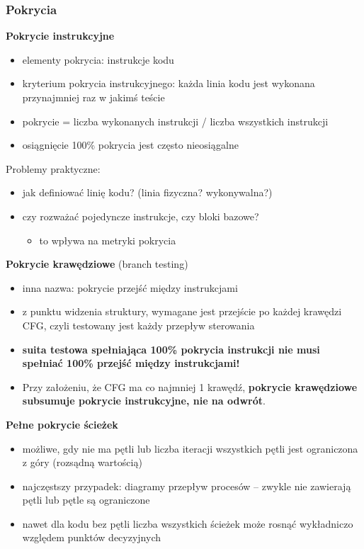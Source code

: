 \documentclass[../main.tex]{subfiles}
\begin{document}
    \subsubsection{Pokrycia}

    \textbf{Pokrycie instrukcyjne}
    \begin{itemize}
        \item elementy pokrycia: instrukcje kodu
        \item kryterium pokrycia instrukcyjnego: każda linia kodu jest wykonana
        przynajmniej raz w jakimś teście
        \item pokrycie = liczba wykonanych instrukcji / liczba wszystkich instrukcji
        \item osiągnięcie 100\% pokrycia jest często nieosiągalne
    \end{itemize}
    Problemy praktyczne:
    \begin{itemize}
        \item jak definiować linię kodu? (linia fizyczna? wykonywalna?)
        \item czy rozważać pojedyncze instrukcje, czy bloki bazowe?
        \begin{itemize}
            \item to wpływa na metryki pokrycia
        \end{itemize}
    \end{itemize}


    \textbf{Pokrycie krawędziowe} (branch testing)
    \begin{itemize}
        \item inna nazwa: pokrycie przejść między instrukcjami
        \item z punktu widzenia struktury, wymagane jest przejście po każdej
        krawędzi CFG, czyli testowany jest każdy przepływ sterowania
        \item \textbf{suita testowa spełniająca 100\% pokrycia instrukcji nie musi
        spełniać 100\% przejść między instrukcjami!}
        \item Przy założeniu, że CFG ma co najmniej 1 krawędź, \textbf{pokrycie
        krawędziowe subsumuje pokrycie instrukcyjne, nie na odwrót}.
    \end{itemize}


    \textbf{Pełne pokrycie ścieżek}
    \begin{itemize}
        \item możliwe, gdy nie ma pętli lub liczba iteracji wszystkich pętli jest ograniczona z góry (rozsądną wartością)
        \item najczęstszy przypadek: diagramy przepływ procesów – zwykle nie zawierają pętli lub pętle są ograniczone
        \item nawet dla kodu bez pętli liczba wszystkich ścieżek może rosnąć wykładniczo względem punktów decyzyjnych
    \end{itemize}
\end{document}
